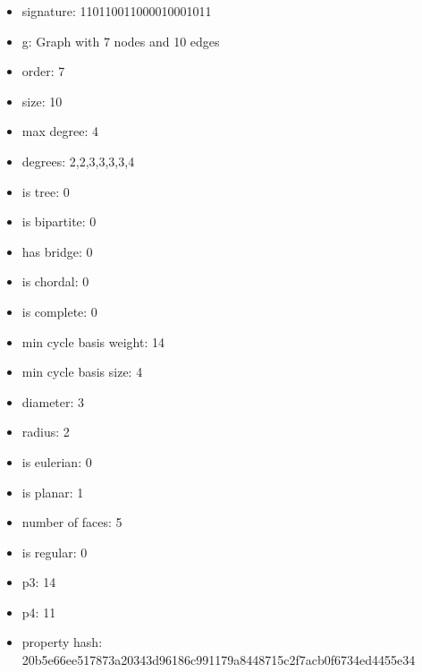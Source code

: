 \begin{itemize}
\item signature: 110110011000010001011
\item g: Graph with 7 nodes and 10 edges
\item order: 7
\item size: 10
\item max degree: 4
\item degrees: 2,2,3,3,3,3,4
\item is tree: 0
\item is bipartite: 0
\item has bridge: 0
\item is chordal: 0
\item is complete: 0
\item min cycle basis weight: 14
\item min cycle basis size: 4
\item diameter: 3
\item radius: 2
\item is eulerian: 0
\item is planar: 1
\item number of faces: 5
\item is regular: 0
\item p3: 14
\item p4: 11
\item property hash: 20b5e66ee517873a20343d96186c991179a8448715c2f7acb0f6734ed4455e34
\end{itemize}
\newpage
\begin{figure}
\end{figure}
